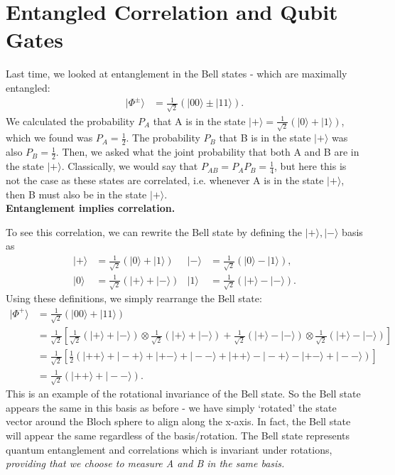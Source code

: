 \documentclass[a4paper, 11pt, normalem]{report}
\begin{document}
\chapter{Entangled Correlation and Qubit Gates}
Last time, we looked at entanglement in the Bell states - which are maximally entangled:
\begin{align}
    |\Phi^\pm\rangle &= \frac{1}{\sqrt{2}}\left(|00\rangle\pm|11\rangle\right).
\end{align}
We calculated the probability $P_A$ that A is in the state $|+\rangle=\frac{1}{\sqrt{2}}\left(|0\rangle+|1\rangle\right)$, which we found was $P_A=\frac12$.
The probability $P_B$ that B is in the state $|+\rangle$ was also $P_B=\frac12$.
Then, we asked what the joint probability that both A and B are in the state $|+\rangle$.
Classically, we would say that $P_{AB}=P_AP_B=\frac14$, but here this is not the case as these states are correlated, i.e. whenever A is in the state $|+\rangle$, then B must also be in the state $|+\rangle$.\\
\textbf{Entanglement implies correlation.}

To see this correlation, we can rewrite the Bell state by defining the $|+\rangle,|-\rangle$ basis as
\begin{align}
    |+\rangle &= \frac{1}{\sqrt{2}}\left(|0\rangle+|1\rangle\right) & |-\rangle &= \frac{1}{\sqrt{2}}\left(|0\rangle-|1\rangle\right), \\
    |0\rangle &= \frac{1}{\sqrt{2}}\left(|+\rangle+|-\rangle\right) & |1\rangle &= \frac{1}{\sqrt{2}}\left(|+\rangle-|-\rangle\right).
\end{align}
Using these definitions, we simply rearrange the Bell state:
\begin{align}
    |\Phi^+\rangle &= \frac{1}{\sqrt{2}}\left(|00\rangle+|11\rangle\right) \\
                   &= \frac{1}{\sqrt{2}}\left[\frac{1}{\sqrt{2}}\left(|+\rangle+|-\rangle\right)\otimes\frac{1}{\sqrt{2}}\left(|+\rangle+|-\rangle\right)+\frac{1}{\sqrt{2}}\left(|+\rangle-|-\rangle\right)\otimes\frac{1}{\sqrt{2}}\left(|+\rangle-|-\rangle\right)\right] \\
                   &= \frac{1}{\sqrt{2}}\left[\frac12\left(|++\rangle+|-+\rangle+|+-\rangle + |--\rangle + |++\rangle - |-+\rangle - |+-\rangle + |--\rangle\right)\right] \\
                   &= \frac{1}{\sqrt{2}}\left(|++\rangle+|--\rangle\right).
\end{align}
This is an example of the rotational invariance of the Bell state.
So the Bell state appears the same in this basis as before - we have simply `rotated' the state vector around the Bloch sphere to align along the x-axis.
In fact, the Bell state will appear the same regardless of the basis/rotation.
The Bell state represents quantum entanglement and correlations which is invariant under rotations, \emph{providing that we choose to measure A and B in the same basis.}
\end{document}
